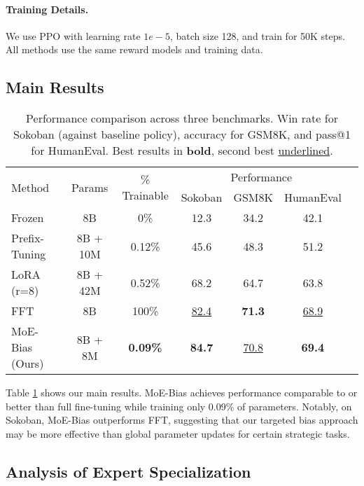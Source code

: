 \documentclass{article}
\begin{document}
\paragraph{Training Details.} We use PPO with learning rate $1e-5$, batch size 128, and train for 50K steps. All methods use the same reward models and training data.

\subsection{Main Results}

\begin{table}[t]
\centering
\caption{Performance comparison across three benchmarks. Win rate for Sokoban (against baseline policy), accuracy for GSM8K, and pass@1 for HumanEval. Best results in \textbf{bold}, second best \underline{underlined}.}
\label{tab:main_results}
\begin{tabular}{lcccccc}
\toprule
\multirow{2}{*}{Method} & \multirow{2}{*}{Params} & \multirow{2}{*}{\% Trainable} & \multicolumn{3}{c}{Performance} \\
\cmidrule{4-6}
& & & Sokoban & GSM8K & HumanEval \\
\midrule
Frozen & 8B & 0\% & 12.3 & 34.2 & 42.1 \\
Prefix-Tuning & 8B + 10M & 0.12\% & 45.6 & 48.3 & 51.2 \\
LoRA (r=8) & 8B + 42M & 0.52\% & 68.2 & 64.7 & 63.8 \\
FFT & 8B & 100\% & \underline{82.4} & \textbf{71.3} & \underline{68.9} \\
\midrule
MoE-Bias (Ours) & 8B + 8M & \textbf{0.09\%} & \textbf{84.7} & \underline{70.8} & \textbf{69.4} \\
\bottomrule
\end{tabular}
\end{table}

Table \ref{tab:main_results} shows our main results. MoE-Bias achieves performance comparable to or better than full fine-tuning while training only 0.09\% of parameters. Notably, on Sokoban, MoE-Bias outperforms FFT, suggesting that our targeted bias approach may be more effective than global parameter updates for certain strategic tasks.

\subsection{Analysis of Expert Specialization}
\end{document}
